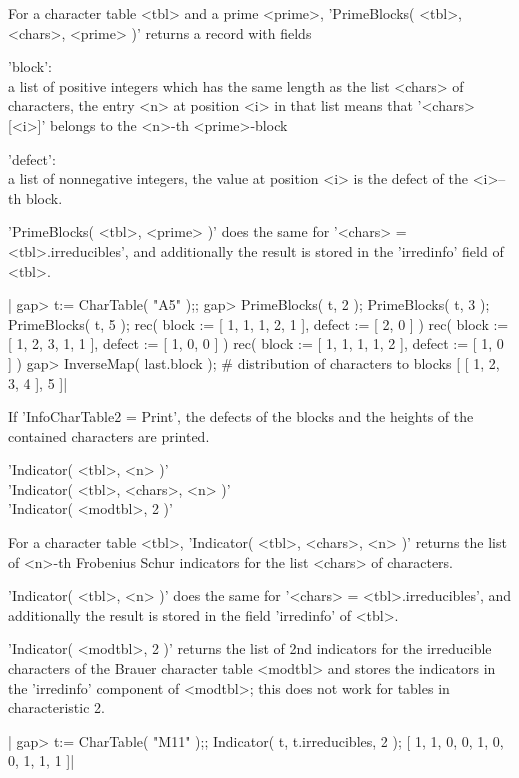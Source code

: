 For a  character table  <tbl> and a  prime <prime>,  'PrimeBlocks( <tbl>,
<chars>, <prime> )' returns a record with fields

'block':\\
     a list of positive integers which has the same length as the list
     <chars> of characters,
     the entry <n> at position <i> in that list means that '<chars>[<i>]'
     belongs to the <n>-th <prime>-block

'defect':\\
     a list of nonnegative integers, the value at position <i> is the
     defect of the <i>--th block.

'PrimeBlocks(   <tbl>,   <prime>  )'  does    the same  for    '<chars> =
<tbl>.irreducibles', and  additionally  the  result  is stored    in  the
'irredinfo' field of <tbl>.

|    gap> t:= CharTable( "A5" );;
    gap> PrimeBlocks( t, 2 ); PrimeBlocks( t, 3 ); PrimeBlocks( t, 5 );
    rec(
      block := [ 1, 1, 1, 2, 1 ],
      defect := [ 2, 0 ] )
    rec(
      block := [ 1, 2, 3, 1, 1 ],
      defect := [ 1, 0, 0 ] )
    rec(
      block := [ 1, 1, 1, 1, 2 ],
      defect := [ 1, 0 ] )
    gap> InverseMap( last.block ); # distribution of characters to blocks
    [ [ 1, 2, 3, 4 ], 5 ]|

If 'InfoCharTable2 = Print', the defects of the blocks and the heights of
the contained characters are printed.

%

'Indicator( <tbl>, <n> )'\\
'Indicator( <tbl>, <chars>, <n> )'\\
'Indicator( <modtbl>, 2 )'

For a character  table <tbl>, 'Indicator(  <tbl>, <chars>, <n> )' returns
the list of <n>-th  Frobenius  Schur indicators  for the list  <chars> of
characters.

'Indicator(  <tbl>,  <n>    )'    does  the   same   for    '<chars>    =
<tbl>.irreducibles', and additionally the result  is stored in the  field
'irredinfo' of <tbl>.

'Indicator( <modtbl>, 2  )' returns the   list of 2nd  indicators for the
irreducible characters of the Brauer  character table <modtbl> and stores
the  indicators in the 'irredinfo'  component of  <modtbl>; this does not
work for tables in characteristic 2.

|    gap> t:= CharTable( "M11" );; Indicator( t, t.irreducibles, 2 );
    [ 1, 1, 0, 0, 1, 0, 0, 1, 1, 1 ]|


